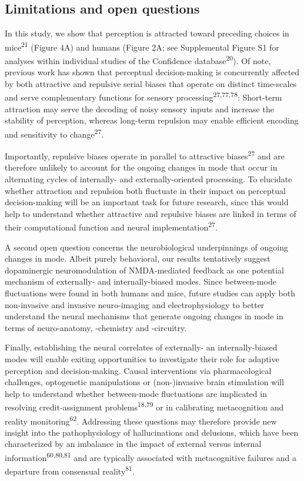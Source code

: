 \documentclass[
]{article}
\begin{document}
\hypertarget{limitations-and-open-questions}{%
\subsection{Limitations and open
questions}\label{limitations-and-open-questions}}

In this study, we show that perception is attracted toward preceding
choices in mice\textsuperscript{21} (Figure 4A) and humans (Figure 2A;
see Supplemental Figure S1 for analyses within individual studies of the
Confidence database\textsuperscript{20}). Of note, previous work has
shown that perceptual decision-making is concurrently affected by both
attractive and repulsive serial biases that operate on distinct
time-scales and serve complementary functions for sensory
processing\textsuperscript{27,77,78}: Short-term attraction may serve
the decoding of noisy sensory inputs and increase the stability of
perception, whereas long-term repulsion may enable efficient encoding
and sensitivity to change\textsuperscript{27}.

Importantly, repulsive biases operate in parallel to attractive
biases\textsuperscript{27} and are therefore unlikely to account for the
ongoing changes in mode that occur in alternating cycles of internally-
and externally-oriented processing. To elucidate whether attraction and
repulsion both fluctuate in their impact on perceptual decision-making
will be an important task for future research, since this would help to
understand whether attractive and repulsive biases are linked in terms
of their computational function and neural
implementation\textsuperscript{27}.

A second open question concerns the neurobiological underpinnings of
ongoing changes in mode. Albeit purely behavioral, our results
tentatively suggest dopaminergic neuromodulation of NMDA-mediated
feedback as one potential mechanism of externally- and internally-biased
modes. Since between-mode fluctuations were found in both humans and
mice, future studies can apply both non-invasive and invasive
neuro-imaging and electrophysiology to better understand the neural
mechanisms that generate ongoing changes in mode in terms of
neuro-anatomy, -chemistry and -circuitry.

Finally, establishing the neural correlates of externally- an
internally-biased modes will enable exiting opportunities to investigate
their role for adaptive perception and decision-making. Causal
interventions via pharmacological challenges, optogenetic manipulations
or (non-)invasive brain stimulation will help to understand whether
between-mode fluctuations are implicated in resolving credit-assignment
problems\textsuperscript{18,79} or in calibrating metacognition and
reality monitoring\textsuperscript{62}. Addressing these questions may
therefore provide new insight into the pathophysiology of hallucinations
and delusions, which have been characterized by an imbalance in the
impact of external versus internal information\textsuperscript{60,80,81}
and are typically associated with metacognitive failures and a departure
from consensual reality\textsuperscript{81}.
\end{document}
